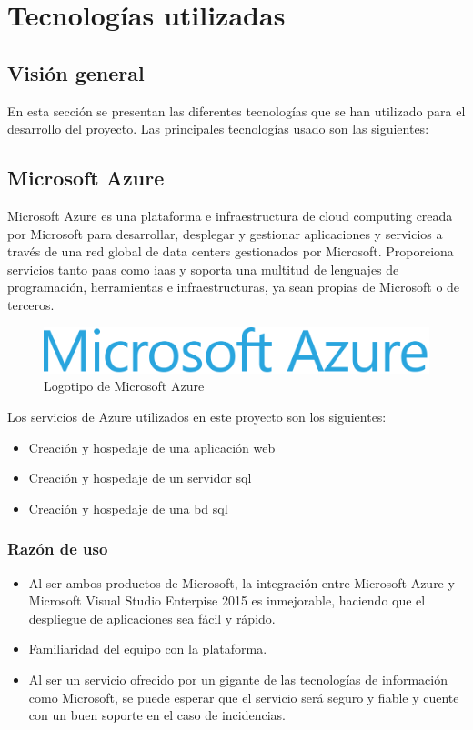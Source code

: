 \chapter{Tecnologías utilizadas}

\section{Visión general}

En esta sección se presentan las diferentes tecnologías que se han utilizado para el desarrollo del proyecto. Las principales tecnologías usado son las siguientes:

\section{Microsoft Azure}

Microsoft Azure\cite{Azure} es una plataforma e infraestructura de cloud computing creada por Microsoft para desarrollar, desplegar y gestionar aplicaciones y servicios a través de una red global de data centers gestionados por Microsoft.
Proporciona servicios tanto \acrshort{paas} como \acrshort{iaas} y soporta una multitud de lenguajes de programación, herramientas e infraestructuras, ya sean propias de Microsoft o de terceros.

\begin{figure}[!htbp]
	\centering
	\includegraphics[scale=1.2]{fig/microsoft_azure}
	\caption{Logotipo de Microsoft Azure}
\end{figure}

Los servicios de Azure utilizados en este proyecto son los siguientes:
\begin{itemize}
	\item Creación y hospedaje de una aplicación web
	\item Creación y hospedaje de un servidor \acrshort{sql}
	\item Creación y hospedaje de una \acrshort{bd} \acrshort{sql}
\end{itemize}

\subsection{Razón de uso}

\begin{itemize}
	\item Al ser ambos productos de Microsoft, la integración entre Microsoft Azure y Microsoft Visual Studio Enterpise 2015 es inmejorable, haciendo que el despliegue de aplicaciones sea fácil y rápido.
	\item Familiaridad del equipo con la plataforma.
	\item Al ser un servicio ofrecido por un gigante de las tecnologías de información como Microsoft, se puede esperar que el servicio será seguro y fiable y cuente con un buen soporte en el caso de incidencias.

\end{itemize}

